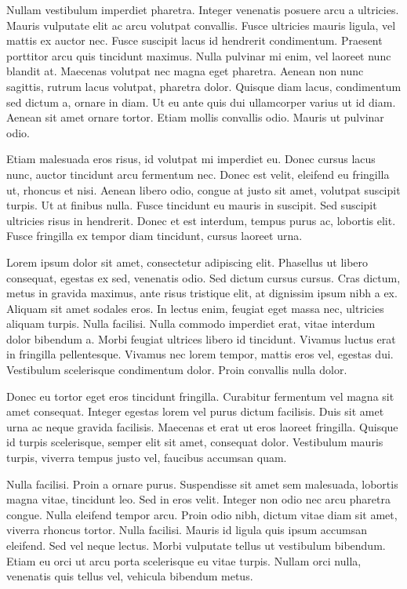 Nullam vestibulum imperdiet pharetra. Integer venenatis posuere arcu a ultricies. Mauris vulputate elit ac arcu volutpat convallis. Fusce ultricies mauris ligula, vel mattis ex auctor nec. Fusce suscipit lacus id hendrerit condimentum. Praesent porttitor arcu quis tincidunt maximus. Nulla pulvinar mi enim, vel laoreet nunc blandit at. Maecenas volutpat nec magna eget pharetra. Aenean non nunc sagittis, rutrum lacus volutpat, pharetra dolor. Quisque diam lacus, condimentum sed dictum a, ornare in diam. Ut eu ante quis dui ullamcorper varius ut id diam. Aenean sit amet ornare tortor. Etiam mollis convallis odio. Mauris ut pulvinar odio.

Etiam malesuada eros risus, id volutpat mi imperdiet eu. Donec cursus lacus nunc, auctor tincidunt arcu fermentum nec. Donec est velit, eleifend eu fringilla ut, rhoncus et nisi. Aenean libero odio, congue at justo sit amet, volutpat suscipit turpis. Ut at finibus nulla. Fusce tincidunt eu mauris in suscipit. Sed suscipit ultricies risus in hendrerit. Donec et est interdum, tempus purus ac, lobortis elit. Fusce fringilla ex tempor diam tincidunt, cursus laoreet urna.

Lorem ipsum dolor sit amet, consectetur adipiscing elit. Phasellus ut libero consequat, egestas ex sed, venenatis odio. Sed dictum cursus cursus. Cras dictum, metus in gravida maximus, ante risus tristique elit, at dignissim ipsum nibh a ex. Aliquam sit amet sodales eros. In lectus enim, feugiat eget massa nec, ultricies aliquam turpis. Nulla facilisi. Nulla commodo imperdiet erat, vitae interdum dolor bibendum a. Morbi feugiat ultrices libero id tincidunt. Vivamus luctus erat in fringilla pellentesque. Vivamus nec lorem tempor, mattis eros vel, egestas dui. Vestibulum scelerisque condimentum dolor. Proin convallis nulla dolor.

Donec eu tortor eget eros tincidunt fringilla. Curabitur fermentum vel magna sit amet consequat. Integer egestas lorem vel purus dictum facilisis. Duis sit amet urna ac neque gravida facilisis. Maecenas et erat ut eros laoreet fringilla. Quisque id turpis scelerisque, semper elit sit amet, consequat dolor. Vestibulum mauris turpis, viverra tempus justo vel, faucibus accumsan quam.

Nulla facilisi. Proin a ornare purus. Suspendisse sit amet sem malesuada, lobortis magna vitae, tincidunt leo. Sed in eros velit. Integer non odio nec arcu pharetra congue. Nulla eleifend tempor arcu. Proin odio nibh, dictum vitae diam sit amet, viverra rhoncus tortor. Nulla facilisi. Mauris id ligula quis ipsum accumsan eleifend. Sed vel neque lectus. Morbi vulputate tellus ut vestibulum bibendum. Etiam eu orci ut arcu porta scelerisque eu vitae turpis. Nullam orci nulla, venenatis quis tellus vel, vehicula bibendum metus.


